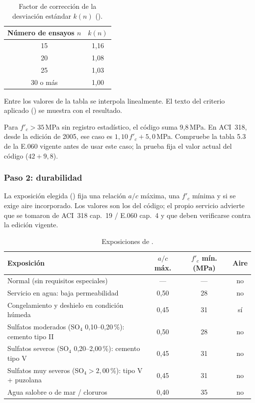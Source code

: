 \begin{table}[H]
	\centering
	\caption{Factor de corrección de la desviación estándar $k(n)$ ().}
	\label{tab:con-factor}
	\begin{tabular}{cc}
		\hline
		\textbf{Número de ensayos $n$} & \textbf{$k(n)$} \\ \hline
		15 & 1,16 \\
		20 & 1,08 \\
		25 & 1,03 \\
		30 o más & 1,00 \\
		\hline
	\end{tabular}
\end{table}

Entre los valores de la tabla se interpola linealmente. El texto del criterio aplicado () se
muestra con el resultado.

\begin{advertencia}
	Para $f'_c > 35$\,MPa sin registro estadístico, el código suma 9,8\,MPa. En ACI~318, desde la edición de 2005, ese
	caso es $1{,}10\,f'_c + 5{,}0$\,MPa. Compruebe la tabla 5.3 de la E.060 vigente antes de usar este caso; la prueba
	 fija el valor actual del código ($42 + 9{,}8$).
\end{advertencia}

\subsubsection{Paso 2: durabilidad}

La exposición elegida () fija una relación $a/c$ máxima, una $f'_c$ mínima y si se
exige aire incorporado. Los valores son los del código; el propio servicio advierte que se tomaron de ACI~318 cap.~19 /
E.060 cap.~4 y que deben verificarse contra la edición vigente.

\begin{table}[H]
	\centering
	\caption{Exposiciones de .}
	\label{tab:con-exposicion}
	\begin{tabular}{L{6.6cm}ccc}
		\hline
		\textbf{Exposición} & \textbf{$a/c$ máx.} & \textbf{$f'_c$ mín. (MPa)} & \textbf{Aire} \\ \hline
		Normal (sin requisitos especiales) & --- & --- & no \\
		Servicio en agua: baja permeabilidad & 0,50 & 28 & no \\
		Congelamiento y deshielo en condición húmeda & 0,45 & 31 & sí \\
		Sulfatos moderados (SO$_4$ 0,10--0,20\,\%): cemento tipo II & 0,50 & 28 & no \\
		Sulfatos severos (SO$_4$ 0,20--2,00\,\%): cemento tipo V & 0,45 & 31 & no \\
		Sulfatos muy severos (SO$_4 > 2{,}00$\,\%): tipo V + puzolana & 0,45 & 31 & no \\
		Agua salobre o de mar / cloruros & 0,40 & 35 & no \\
		\hline
	\end{tabular}
\end{table}


